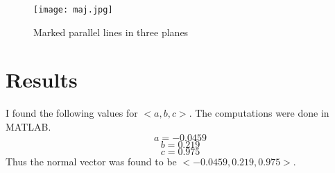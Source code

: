 \documentclass[12pt]{article}
\begin{document}
\begin{figure}[ht!]
    \centering
    \texttt{[image: maj.jpg]}
    \caption{Marked parallel lines in three planes}
    \label{giv}
\end{figure}

\section{Results}
I found the following values for $<a,b,c>$. The computations were done in MATLAB.
$$a = -0.0459$$
$$b = 0.219$$
$$c = 0.975 $$
Thus the normal vector was found to be $<-0.0459,  0.219,0.975 >$.
\end{document}
